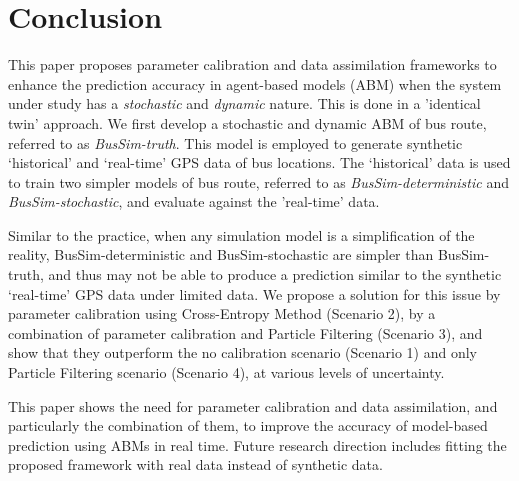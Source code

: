\section{Conclusion\label{s:conclusion}}

This paper proposes parameter calibration and data assimilation frameworks to enhance the prediction accuracy in agent-based models (ABM) when the system under study has a \textit{stochastic} and \textit{dynamic} nature. This is done in a 'identical twin' approach. We first develop a stochastic and dynamic ABM of bus route, referred to as \textit{BusSim-truth}. This model is employed to generate synthetic `historical' and `real-time' GPS data of bus locations. The `historical' data is used to train two simpler models of bus route, referred to as \textit{BusSim-deterministic} and \textit{BusSim-stochastic}, and evaluate against the 'real-time' data. 

Similar to the practice, when any simulation model is a simplification of the reality, BusSim-deterministic and BusSim-stochastic are simpler than BusSim-truth, and thus may not be able to produce a prediction similar to the synthetic `real-time' GPS data under limited data. We propose a solution for this issue by parameter calibration using Cross-Entropy Method (Scenario 2), by a combination of parameter calibration and Particle Filtering (Scenario 3), and show that they outperform the no calibration scenario (Scenario 1) and only Particle Filtering scenario (Scenario 4), at various levels of uncertainty. 

This paper shows the need for parameter calibration and data assimilation, and particularly the combination of them, to improve the accuracy of model-based prediction using ABMs in real time. Future research direction includes fitting the proposed framework with real data instead of synthetic data. 